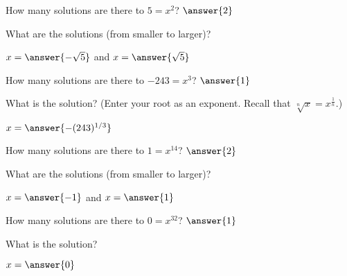 \documentclass{ximera}
\author{Elizabeth Miller}
\begin{document}
\begin{exercise}
How many solutions are there to $5=x^2$? $\answer{2}$
\begin{exercise}
What are the solutions (from smaller to larger)?

$x=\answer{-\sqrt{5}}$ and $x=\answer{\sqrt{5}}$
\end{exercise}
\end{exercise}


\begin{exercise}
How many solutions are there to $-243=x^3$? $\answer{1}$
\begin{exercise}
What is the solution?  (Enter your root as an exponent.  Recall that $\sqrt[n]{x}=x^{\frac{1}{n}}$.)

$x=\answer{-(243)^{1/3}}$
\end{exercise}
\end{exercise}


\begin{exercise}
How many solutions are there to $1=x^{14}$? $\answer{2}$
\begin{exercise}
What are the solutions (from smaller to larger)?

$x=\answer{-1}$ and $x=\answer{1}$
\end{exercise}
\end{exercise}


\begin{exercise}
How many solutions are there to $0=x^{32}$? $\answer{1}$
\begin{exercise}
What is the solution?

$x=\answer{0}$
\end{exercise}
\end{exercise}
\end{document}
